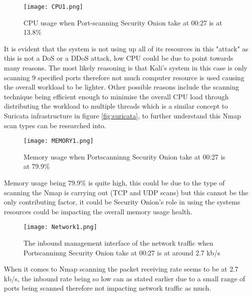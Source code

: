 \documentclass[12pt]{article}
\begin{document}
		\begin{center}
		\begin{figure}[H]
			\centering
			\texttt{[image: CPU1.png]}
			\caption{CPU usage when Port-scanning Security Onion take at 00:27 is at 13.8\% } 
			\label{attack1}
			
		\end{figure}
		\end{center}
		
		
		It is evident that the system is not using up all of its resources in this "attack" as this is not a DoS or a DDoS attack, low CPU could be due to point towards many reasons. The most likely reasoning is that Kali's system in this case is only scanning 9 specified ports therefore not much computer resource is used causing the overall workload to be lighter. Other possible reasons include the scanning technique being efficient enough to minimise the overall CPU load through distributing the workload to multiple threads which is a similar concept to Suricata infrastructure in figure \ref{fig:suricata}, to further understand this Nmap scan types can be researched into. 
		
		\begin{center}
		\begin{figure}[H]
			\centering
			\texttt{[image: MEMORY1.png]}
			\caption{Memory usage when Portscanninng Security Onion take at 00:27 is at 79.9\% } 
			
		\end{figure}
		\end{center}
		
		
		Memory usage being 79.9\% is quite high, this could be due to the type of scanning the Nmap is carrying out (TCP and UDP scans) but this cannot be the only contributing factor, it could be Security Onion's role in using the systems resources could be impacting the overall memory usage health.
		
		
		
		\begin{center}
		\begin{figure}[H]
			\centering
			\texttt{[image: Network1.png]}
			\caption{The inbound management interface of the network traffic when Portscanninng Security Onion take at 00:27 is at around 2.7 kb/s} 
			\label{fig:attack1}
		\end{figure}
		\end{center}
		
		When it comes to Nmap scanning the packet receiving rate seems to be at 2.7 kb/s, the inbound rate being so low can as stated earlier due to a small range of ports being scanned therefore not impacting network traffic as much.
		
\end{document}
